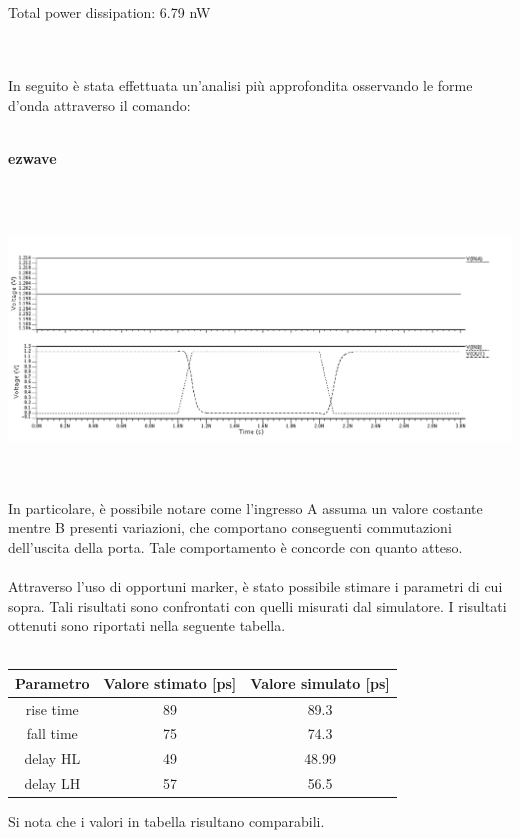 \documentclass[11pt,  english, makeidx, a4paper, titlepage, oneside]{book}
\begin{document}
\\\\
\centerline{Total power dissipation: 6.79 nW}
\\\\
In seguito è stata effettuata un'analisi più approfondita osservando le forme d'onda attraverso il comando:
\\\\
\centerline{\textbf{ezwave}}
\\\\
\centerline{\includegraphics[width=14cm]{./img/Lab_5/waveform_1.png}}
\\\\
In particolare, è possibile notare come l'ingresso A assuma un valore costante mentre B presenti variazioni, che comportano conseguenti commutazioni dell'uscita della porta. Tale comportamento è concorde con quanto atteso.
\\\\
Attraverso l'uso di opportuni marker, è stato possibile stimare i parametri di cui sopra. Tali risultati sono confrontati con quelli misurati dal simulatore. I risultati ottenuti sono riportati nella seguente tabella.
\\\\
\begin{center}
	\begin{tabular}{|c|c|c|}
	\hline
	Parametro & Valore stimato [ps] & Valore simulato [ps] \\
	\hline
	 rise time & 89 &  89.3 \\
	\hline
	 fall time & 75 & 74.3 \\
	\hline
	delay HL & 49 &  48.99 \\
	\hline
	delay LH & 57  &  56.5 \\
	\hline
	\end{tabular}	
\end{center}
\vspace{0.3cm}
Si nota che i valori in tabella risultano comparabili.
\\\\
\end{document}
